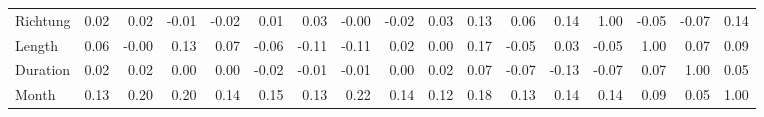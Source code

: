 \begin{tabular}{lrrrrrrrrrrrrrrrr}
Richtung &  0.02 &  0.02 & -0.01 & -0.02 &   0.01 &   0.03 & -0.00 &  -0.02 &   0.03 & 0.13 &  0.06 &    0.14 &      1.00 &   -0.05 &     -0.07 &   0.14 \\
Length   &  0.06 & -0.00 &  0.13 &  0.07 &  -0.06 &  -0.11 & -0.11 &   0.02 &   0.00 & 0.17 & -0.05 &    0.03 &     -0.05 &    1.00 &      0.07 &   0.09 \\
Duration &  0.02 &  0.02 &  0.00 &  0.00 &  -0.02 &  -0.01 & -0.01 &   0.00 &   0.02 & 0.07 & -0.07 &   -0.13 &     -0.07 &    0.07 &      1.00 &   0.05 \\
Month    &  0.13 &  0.20 &  0.20 &  0.14 &   0.15 &   0.13 &  0.22 &   0.14 &   0.12 & 0.18 &  0.13 &    0.14 &      0.14 &    0.09 &      0.05 &   1.00 \\
\bottomrule
\end{tabular}
